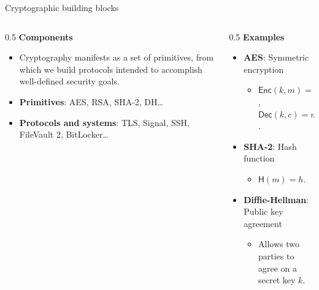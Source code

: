 \ifdefined\PRESENTATION\else\PassOptionsToClass{handout}{beamer}\fi\documentclass[aspectratio=169, lualatex]{beamer}
\begin{document}
\begin{frame}{Cryptographic building blocks}
	\begin{columns}[c]
		\begin{column}{0.5\textwidth}
			\textbf{Components}
			\begin{itemize}[<+->]
				\item Cryptography manifests as a set of primitives, from which we
				      build protocols intended to accomplish well-defined security goals.
				\item \textbf{Primitives}: AES, RSA, SHA-2, DH\ldots
				\item \textbf{Protocols and systems}: TLS, Signal, SSH, FileVault 2, BitLocker\ldots
			\end{itemize}
		\end{column}

		\begin{column}{0.5\textwidth}
			\textbf{Examples}
			\begin{itemize}[<+->]
				\item \textbf{AES}: Symmetric encryption
				      \begin{itemize}
					      \item $\mathsf{Enc}(k, m) = c$, $\mathsf{Dec}(k, c) = m$.
				      \end{itemize}
				\item \textbf{SHA-2}: Hash function
				      \begin{itemize}
					      \item $\mathsf{H}(m) = h$.
				      \end{itemize}
				\item \textbf{Diffie-Hellman}: Public key agreement
				      \begin{itemize}
					      \item Allows two parties to agree on a secret key $k$.
				      \end{itemize}
			\end{itemize}
		\end{column}
	\end{columns}
\end{frame}
\end{document}
